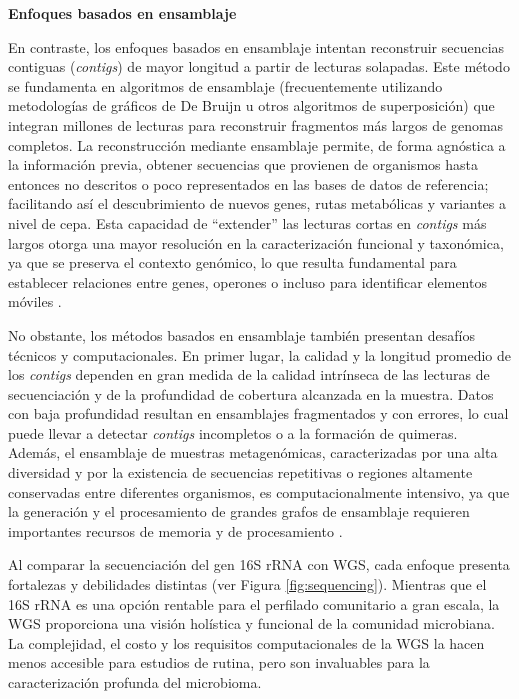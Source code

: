 \textbf{Enfoques basados en ensamblaje}

En contraste, los enfoques basados en ensamblaje intentan reconstruir secuencias contiguas (\textit{contigs}) de mayor longitud a partir de lecturas solapadas. Este método se fundamenta en algoritmos de ensamblaje (frecuentemente utilizando metodologías de gráficos de De Bruijn \cite{de1948combinatorial} u otros algoritmos de superposición) que integran millones de lecturas para reconstruir fragmentos más largos de genomas completos. La reconstrucción mediante ensamblaje permite, de forma agnóstica a la información previa, obtener secuencias que provienen de organismos hasta entonces no descritos o poco representados en las bases de datos de referencia; facilitando así el descubrimiento de nuevos genes, rutas metabólicas y variantes a nivel de cepa. Esta capacidad de “extender” las lecturas cortas en \textit{contigs} más largos otorga una mayor resolución en la caracterización funcional y taxonómica, ya que se preserva el contexto genómico, lo que resulta fundamental para establecer relaciones entre genes, operones o incluso para identificar elementos móviles \cite{bharti2021current, agustinho2024unveiling}.

No obstante, los métodos basados en ensamblaje también presentan desafíos técnicos y computacionales. En primer lugar, la calidad y la longitud promedio de los \textit{contigs} dependen en gran medida de la calidad intrínseca de las lecturas de secuenciación y de la profundidad de cobertura alcanzada en la muestra. Datos con baja profundidad resultan en ensamblajes fragmentados y con errores, lo cual puede llevar a detectar \textit{contigs} incompletos o a la formación de quimeras. Además, el ensamblaje de muestras metagenómicas, caracterizadas por una alta diversidad y por la existencia de secuencias repetitivas o regiones altamente conservadas entre diferentes organismos, es computacionalmente intensivo, ya que la generación y el procesamiento de grandes grafos de ensamblaje requieren importantes recursos de memoria y de procesamiento \cite{agustinho2024unveiling}.

Al comparar la secuenciación del gen 16S rRNA con WGS, cada enfoque presenta fortalezas y debilidades distintas (ver Figura \ref{fig:sequencing}). Mientras que el 16S rRNA es una opción rentable para el perfilado comunitario a gran escala, la WGS proporciona una visión holística y funcional de la comunidad microbiana. La complejidad, el costo y los requisitos computacionales de la WGS la hacen menos accesible para estudios de rutina, pero son invaluables para la caracterización profunda del microbioma.

